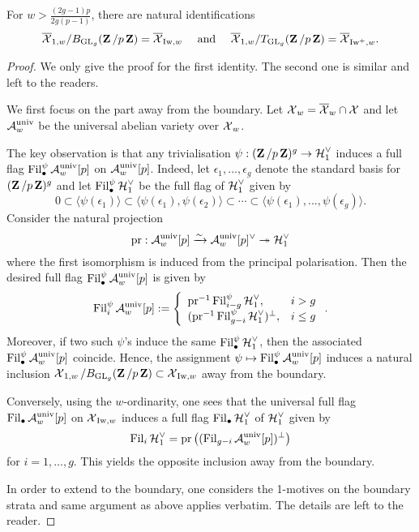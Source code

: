 \begin{Lemma}\label{Lemma: alternative definition of w-locus of (strict) Iwahori level variety}
For $w>\frac{(2g-1)p}{2g(p-1)}$, there are natural identifications
\[
    \overline{\calX}_{1, w}/B_{\GL_g}(\Z/p\Z) = \overline{\calX}_{\Iw, w}\quad \text{ and }\quad \overline{\calX}_{1, w}/T_{\GL_g}(\Z/p\Z) = \overline{\calX}_{\Iw^+, w}.
\]
\end{Lemma}
\begin{proof}
We only give the proof for the first identity. The second one is similar and left to the readers.

We first focus on the part away from the boundary. Let $\calX_{w} = \overline{\calX}_w \cap \calX$ and let $\calA_{w}^{\univ}$ be the universal abelian variety over $\calX_{w}$. 

The key observation is that any trivialisation $\psi:(\Z/p\Z)^g \rightarrow \calH_{1}^{\vee}$ induces a full flag $\Fil_{\bullet}^{\psi} \calA^{\univ}_{w}[p]$ on $\calA^{\univ}_{w}[p]$. Indeed, let $\epsilon_1, \ldots, \epsilon_g$ denote the standard basis for $(\Z/p\Z)^g$ and let $\Fil_{\bullet}^{\psi}\calH_1^{\vee}$ be the full flag of $\calH_1^{\vee}$ given by \[
    0\subset \langle \psi(\epsilon_1) \rangle \subset \langle \psi(\epsilon_1), \psi(\epsilon_2) \rangle \subset \cdots \subset \langle \psi(\epsilon_1), ..., \psi(\epsilon_g)\rangle.
\] 
Consider the natural projection \[
    \pr: \calA_w^{\univ}[p] \xrightarrow{\sim} \calA_w^{\univ}[p]^{\vee} \twoheadrightarrow \calH_1^{\vee}
\] where the first isomorphism is induced from the principal polarisation. Then the desired full flag $\Fil_{\bullet}^{\psi}\calA_w^{\univ}[p]$ is given by \[
    \Fil_{i}^{\psi}\calA_w^{\univ}[p] := \left\{\begin{array}{ll}
        \pr^{-1}\Fil_{i-g}^{\psi}\calH_1^{\vee}, & i > g \\
        (\pr^{-1}\Fil_{g-i}^{\psi}\calH_{1}^{\vee})^{\perp}, & i \leq g 
    \end{array}\right..
\] 
Moreover, if two such $\psi$'s induce the same $\Fil_{\bullet}^{\psi}\calH_1^{\vee}$, then the associated $\Fil_{\bullet}^{\psi}\calA_w^{\univ}[p]$ coincide. Hence, the assignment $\psi\mapsto \Fil_{\bullet}^{\psi} \calA^{\univ}_{w}[p]$ induces a natural inclusion $\calX_{1, w}/B_{\GL_g}(\Z/p\Z) \subset \calX_{\Iw, w}$ away from the boundary.

Conversely, using the $w$-ordinarity, one sees that the universal full flag $\Fil_{\bullet}\calA_w^{\univ}[p]$ on $\calX_{\Iw, w}$ induces a full flag $\Fil_{\bullet}\calH_1^{\vee}$ of $\calH_1^{\vee}$ given by 
\[
    \Fil_{i}\calH_{1}^{\vee} = \pr\left((\Fil_{g-i}\calA_{w}^{\univ}[p])^{\perp}\right)
\] for $i=1, ..., g$.
This yields the opposite inclusion away from the boundary. 

In order to extend to the boundary, one considers the 1-motives on the boundary strata and same argument as above applies verbatim. The details are left to the reader.
\end{proof}

